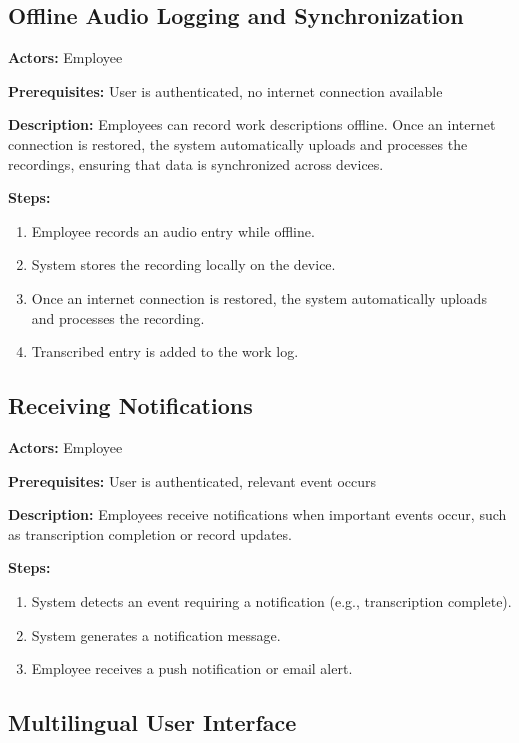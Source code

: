 \documentclass[
  digital,     %
  oneside,     %
  nosansbold,  %
  nocolorbold, %
  lof,         %
  lot,         %
]{fithesis4}
\begin{document}
\subsection{Offline Audio Logging and Synchronization}

\noindent \textbf{Actors:} Employee

\noindent \textbf{Prerequisites:} User is authenticated, no internet connection available

\noindent \textbf{Description:}  
Employees can record work descriptions offline. Once an internet connection is restored, the system automatically uploads and processes the recordings, ensuring that data is synchronized across devices.

\noindent \textbf{Steps:}
\begin{enumerate}
    \item Employee records an audio entry while offline.
    \item System stores the recording locally on the device.
    \item Once an internet connection is restored, the system automatically uploads and processes the recording.
    \item Transcribed entry is added to the work log.
\end{enumerate}

\subsection{Receiving Notifications}

\noindent \textbf{Actors:} Employee

\noindent \textbf{Prerequisites:} User is authenticated, relevant event occurs

\noindent \textbf{Description:}  
Employees receive notifications when important events occur, such as transcription completion or record updates.

\noindent \textbf{Steps:}
\begin{enumerate}
    \item System detects an event requiring a notification (e.g., transcription complete).
    \item System generates a notification message.
    \item Employee receives a push notification or email alert.
\end{enumerate}

\subsection{Multilingual User Interface}
\end{document}
